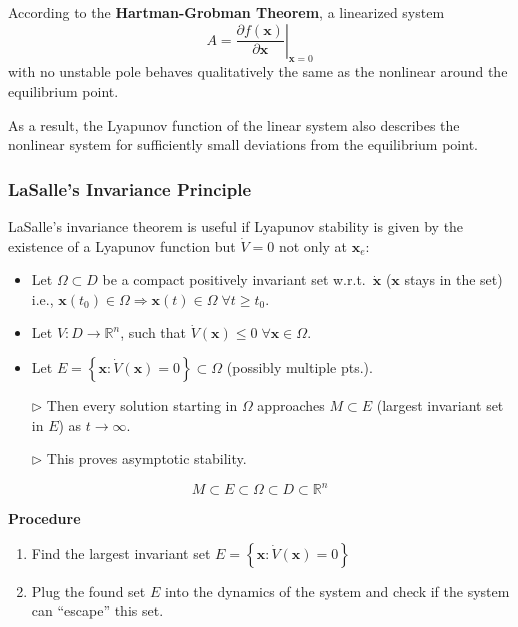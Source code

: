 \newpar{}

According to the \textbf{Hartman-Grobman Theorem}, a linearized system
\noindent\begin{equation*}
    A = \left.\frac{\partial f(\mathbf{x})}{\partial \mathbf{x}} \right|_{\mathbf{x} = 0}
\end{equation*} with no unstable pole behaves qualitatively the same as the nonlinear around the equilibrium point.

\newpar{}
As a result, the Lyapunov function of the linear system also describes the nonlinear system for sufficiently small deviations from the equilibrium point.

\subsubsection{LaSalle's Invariance Principle}
LaSalle's invariance theorem is useful if Lyapunov stability is given by the existence of a Lyapunov function but $\dot{V}=0$ not only at $\mathbf{x}_e$:

\newpar{}
\begin{itemize}[leftmargin=14pt]
    \item Let $\Omega\subset D$ be a compact positively invariant set w.r.t.\ $\dot{\mathbf{x}}$ ($\mathbf{x}$ stays in the set) i.e., $\mathbf{x}(t_0)\in \Omega \Rightarrow \mathbf{x}(t)\in\Omega\; \forall t \geq t_0$.
    \item Let $V:D\to \mathbb{R}^n$, such that $\dot{V}(\mathbf{x})\leq 0\; \forall \mathbf{x}\in \Omega$.
    \item Let $E=\left\{\mathbf{x}: \dot{V}(\mathbf{x})=0\right\}\subset \Omega$ (possibly multiple pts.).
    \item[$\rhd$] Then every solution starting in $\Omega$ approaches $M\subset E$ (largest invariant set in $E$) as $t\to \infty$.
    \item[$\rhd$] This proves asymptotic stability.
\end{itemize}
\newpar{}
\begin{equation*}
    M\subset E \subset \Omega \subset D \subset \mathbb{R}^n
\end{equation*}

\newpar{}
\textbf{Procedure}
\begin{enumerate}
    \item Find the largest invariant set $E=\left\{\mathbf{x}: \dot{V}(\mathbf{x})=0\right\}$
    \item Plug the found set $E$ into the dynamics of the system and check if the system can ``escape'' this set.
\end{enumerate}

